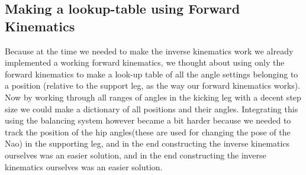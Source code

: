\documentclass[a4paper]{article}
\begin{document}
\subsection{Making a lookup-table using Forward Kinematics}
Because at the time we needed to make the inverse kinematics work we already
implemented a working forward kinematics, we thought about using only the
forward kinematics to make a look-up table of all the angle settings belonging
to a position (relative to the support leg, as the way our forward kinematics
works). Now by working through all ranges of angles in the kicking leg with a
decent step size we could make a dictionary of all positions and their angles. 
Integrating this using the balancing system however became a bit harder because
we needed to track the position of the hip angles(these are used for changing
the pose of the Nao) in the supporting leg, and in the end constructing the
inverse kinematics ourselves was an easier solution, and in the end constructing
the inverse kinematics ourselves was an easier solution.



\end{document}
